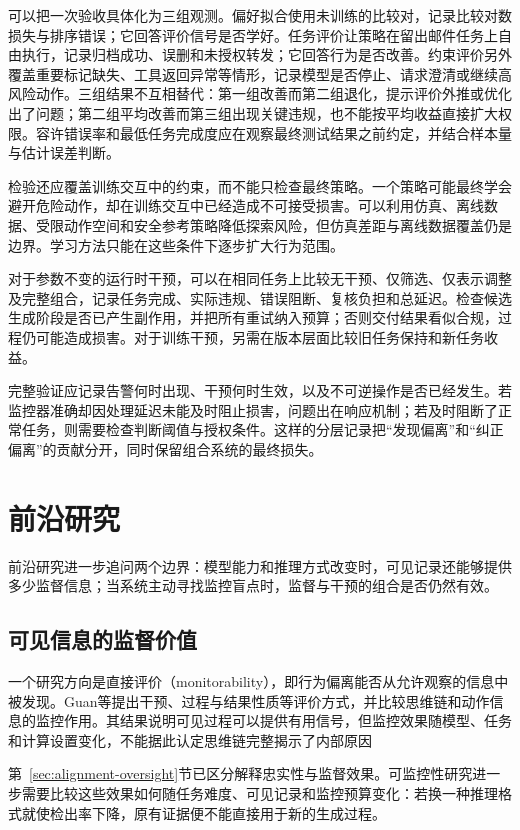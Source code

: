 可以把一次验收具体化为三组观测。偏好拟合使用未训练的比较对，记录比较对数损失与排序错误；它回答评价信号是否学好。任务评价让策略在留出邮件任务上自由执行，记录归档成功、误删和未授权转发；它回答行为是否改善。约束评价另外覆盖重要标记缺失、工具返回异常等情形，记录模型是否停止、请求澄清或继续高风险动作。三组结果不互相替代：第一组改善而第二组退化，提示评价外推或优化出了问题；第二组平均改善而第三组出现关键违规，也不能按平均收益直接扩大权限。容许错误率和最低任务完成度应在观察最终测试结果之前约定，并结合样本量与估计误差判断。

检验还应覆盖训练交互中的约束，而不能只检查最终策略。一个策略可能最终学会避开危险动作，却在训练交互中已经造成不可接受损害。可以利用仿真、离线数据、受限动作空间和安全参考策略降低探索风险，但仿真差距与离线数据覆盖仍是边界。学习方法只能在这些条件下逐步扩大行为范围。

对于参数不变的运行时干预，可以在相同任务上比较无干预、仅筛选、仅表示调整及完整组合，记录任务完成、实际违规、错误阻断、复核负担和总延迟。检查候选生成阶段是否已产生副作用，并把所有重试纳入预算；否则交付结果看似合规，过程仍可能造成损害。对于训练干预，另需在版本层面比较旧任务保持和新任务收益。

完整验证应记录告警何时出现、干预何时生效，以及不可逆操作是否已经发生。若监控器准确却因处理延迟未能及时阻止损害，问题出在响应机制；若及时阻断了正常任务，则需要检查判断阈值与授权条件。这样的分层记录把“发现偏离”和“纠正偏离”的贡献分开，同时保留组合系统的最终损失。

\section{前沿研究}
\label{sec:alignment-frontiers}

前沿研究进一步追问两个边界：模型能力和推理方式改变时，可见记录还能够提供多少监督信息；当系统主动寻找监控盲点时，监督与干预的组合是否仍然有效。

\subsection{可见信息的监督价值}

一个研究方向是直接评价（monitorability），即行为偏离能否从允许观察的信息中被发现。Guan等提出干预、过程与结果性质等评价方式，并比较思维链和动作信息的监控作用。其结果说明可见过程可以提供有用信号，但监控效果随模型、任务和计算设置变化，不能据此认定思维链完整揭示了内部原因

第~\ref{sec:alignment-oversight}节已区分解释忠实性与监督效果。可监控性研究进一步需要比较这些效果如何随任务难度、可见记录和监控预算变化：若换一种推理格式就使检出率下降，原有证据便不能直接用于新的生成过程。

